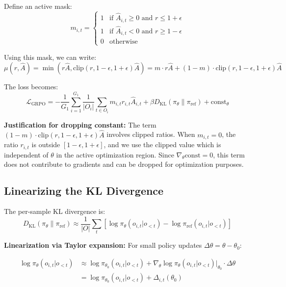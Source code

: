 \documentclass{article}
\begin{document}
Define an active mask:
\begin{equation}
m_{i,t} = \begin{cases}
1 & \text{if } \hat{A}_{i,t} \geq 0 \text{ and } r \leq 1+\epsilon \\
1 & \text{if } \hat{A}_{i,t} < 0 \text{ and } r \geq 1-\epsilon \\
0 & \text{otherwise}
\end{cases}
\end{equation}

Using this mask, we can write:
\begin{equation}
\mu(r, \hat{A}) = \min(r\hat{A}, \text{clip}(r, 1-\epsilon, 1+\epsilon)\hat{A}) = m \cdot r \hat{A} + (1-m) \cdot \text{clip}(r, 1-\epsilon, 1+\epsilon)\hat{A}
\end{equation}

The loss becomes:
\begin{equation}
\mathcal{L}_{\text{GRPO}} = -\frac{1}{G_1}\sum_{i=1}^{G_1} \frac{1}{|O_i|}\sum_{t \in O_i} m_{i,t} r_{i,t} \hat{A}_{i,t} + \beta D_{\text{KL}}(\pi_\theta \| \pi_{\text{ref}}) + \text{const}_\theta
\end{equation}

\textbf{Justification for dropping constant:} The term $(1-m) \cdot \text{clip}(r, 1-\epsilon, 1+\epsilon)\hat{A}$ involves clipped ratios. When $m_{i,t} = 0$, the ratio $r_{i,t}$ is outside $[1-\epsilon, 1+\epsilon]$, and we use the clipped value which is independent of $\theta$ in the active optimization region. Since $\nabla_\theta \text{const} = 0$, this term does not contribute to gradients and can be dropped for optimization purposes.

\subsection{Linearizing the KL Divergence}

The per-sample KL divergence is:
\begin{equation}
D_{\text{KL}}(\pi_\theta \| \pi_{\text{ref}}) \approx \frac{1}{|O|}\sum_{t} \left[\log \pi_\theta(o_{i,t}|o_{<t}) - \log\pi_{\text{ref}}(o_{i,t}|o_{<t})\right]
\end{equation}

\textbf{Linearization via Taylor expansion:} For small policy updates $\Delta\theta = \theta - \theta_0$:

\begin{align}
\log \pi_\theta(o_{i,t}|o_{<t}) &\approx \log \pi_{\theta_0}(o_{i,t}|o_{<t}) + \nabla_\theta \log \pi_{\theta}(o_{i,t}|o_{<t})\big|_{\theta_0} \cdot \Delta\theta \\
&= \log \pi_{\theta_0}(o_{i,t}|o_{<t}) + \Delta_{i,t}(\theta_0)
\end{align}
\end{document}
